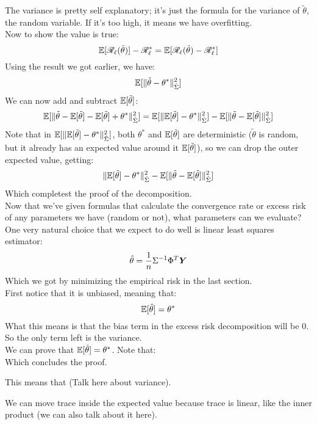 \documentclass[12pt]{article}
\begin{document}
The variance is pretty self explanatory;
it's just the formula for the variance
of $\tilde{\theta}$, the random variable.
If it's too high, it means we have overfitting. \\

Now to show the value is true:
\[ \mathbb{E}[\mathscr{R}_{\ell}(\tilde{\theta})] 
- \mathscr{R}_{\ell}^*
= \mathbb{E}[\mathscr{R}_{\ell}(\tilde{\theta}) - \mathscr{R}_{\ell}^*] \]
Using the result we got earlier, we have:
\[ \mathbb{E}[\|\tilde{\theta} - \theta^* \|_{\hat{\Sigma}}^2] \]
We can now add and subtract $\mathbb{E}[\tilde{\theta}]$:
\[\mathbb{E}[\|\tilde{\theta} - \mathbb{E}[\tilde{\theta}]
- \mathbb{E}[\tilde{\theta}] + \theta^* \|_{\hat{\Sigma}}^2]
= \mathbb{E}[\|\mathbb{E}[\tilde{\theta}] - \theta^* \|_{\hat{\Sigma}}^2]
-\mathbb{E}[\|\tilde{\theta} - \mathbb{E}[\tilde{\theta}] \|_{\hat{\Sigma}}^2] \]
Note that in $\mathbb{E}[\|\mathbb{E}[\tilde{\theta}] 
- \theta^* \|_{\hat{\Sigma}}^2]$,
both $\theta^*$ and $\mathbb{E}[\tilde{\theta}]$
are deterministic ($\tilde{\theta}$ is random,
but it already has an expected value around it
$\mathbb{E}[\tilde{\theta}]$),
so we can drop the outer expected value, getting:
\[ \|\mathbb{E}[\tilde{\theta}] - \theta^* \|_{\hat{\Sigma}}^2
-\mathbb{E}[\|\tilde{\theta} - \mathbb{E}[\tilde{\theta}] \|_{\hat{\Sigma}}^2 ] \]
Which completest the proof of the decomposition. \\

Now that we've given formulas that calculate
the convergence rate or excess risk
of any parameters we have (random or not),
what parameters can we evaluate? \\

One very natural choice that we expect
to do well is linear least squares
estimator:
\[ \hat{\theta} = \dfrac{1}{n}\Sigma^{-1} \Phi^T 
\boldsymbol{Y} \]
Which we got by minimizing the empirical risk
in the last section. \\

First notice that it is unbiased, meaning that:
\[ \mathbb{E}[\hat{\theta}] = \theta^* \]
What this means is that the bias term in
the excess risk decomposition will be $0$. \\
So the only term left is the variance. \\

We can prove that $\mathbb{E}[\hat{\theta}] = \theta^*$.
Note that:
\[  \]
Which concludes the proof.

This means that (Talk here about variance).

We can move trace inside the expected value because
trace is linear, like the inner product (we
can also talk about it here). \\
\end{document}
